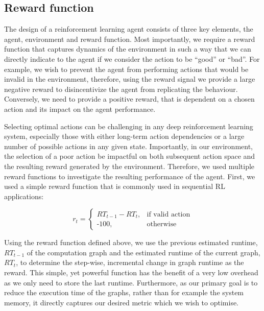 
\subsection{Reward function}
\label{sec:prob:subsec:rwd}
The design of a reinforcement learning agent consists of three key elements, the agent, environment and reward function. Most importantly, we require a reward function that captures dynamics of the environment in such a way that we can directly indicate to the agent if we consider the action to be ``good'' or ``bad''. For example, we wish to prevent the agent from performing actions that would be invalid in the environment, therefore, using the reward signal we provide a large negative reward to disincentivize the agent from replicating the behaviour. Conversely, we need to provide a positive reward, that is dependent on a chosen action and its impact on the agent performance.

Selecting optimal actions can be challenging in any deep reinforcement learning system, especially those with either long-term action dependencies or a large number of possible actions in any given state. Importantly, in our environment, the selection of a poor action be impactful on both subsequent action space and the resulting reward generated by the environment. Therefore, we used multiple reward functions to investigate the resulting performance of the agent. First, we used a simple reward function that is commonly used in sequential RL applications:

$$
r_t =
\begin{cases}
  RT_{t-1} - RT_t, & \text{if valid action}\\
  \text{-}100,            & \text{otherwise}
\end{cases}
$$

Using the reward function defined above, we use the previous estimated runtime, $RT_{t-1}$ of the computation graph and the estimated runtime of the current graph, $RT_t$, to determine the step-wise, incremental change in graph runtime as the reward. This simple, yet powerful function has the benefit of a very low overhead as we only need to store the last runtime. Furthermore, as our primary goal is to reduce the execution time of the graphs, rather than for example the system memory, it directly captures our desired metric which we wish to optimise.

